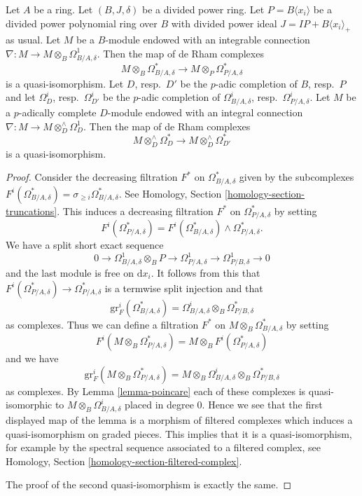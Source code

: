 \begin{lemma}
\label{lemma-relative-poincare}
Let $A$ be a ring. Let $(B, J, \delta)$ be a divided power ring.
Let $P = B\langle x_i \rangle$ be a divided power polynomial
ring over $B$ with divided power ideal $J = IP + B\langle x_i \rangle_{+}$
as usual. Let $M$ be a $B$-module endowed with an integrable connection
$\nabla : M \to M \otimes_B \Omega^1_{B/A, \delta}$. Then the map of
de Rham complexes
$$
M \otimes_B \Omega^*_{B/A, \delta}
\longrightarrow
M \otimes_P \Omega^*_{P/A, \delta}
$$
is a quasi-isomorphism. Let $D$, resp.\ $D'$ be the $p$-adic completion of
$B$, resp.\ $P$ and let $\Omega^i_D$, resp.\ $\Omega^i_{D'}$ be the $p$-adic
completion of $\Omega^i_{B/A, \delta}$,
resp.\ $\Omega^i_{P/A, \delta}$. Let $M$ be a $p$-adically complete
$D$-module endowed with an integral connection
$\nabla : M \to M \otimes^\wedge_D \Omega^1_D$.
Then the map of de Rham complexes
$$
M \otimes^\wedge_D \Omega^*_D
\longrightarrow
M \otimes^\wedge_D \Omega^*_{D'}
$$
is a quasi-isomorphism.
\end{lemma}

\begin{proof}
Consider the decreasing filtration $F^*$ on $\Omega^*_{B/A, \delta}$
given by the subcomplexes
$F^i(\Omega^*_{B/A, \delta}) = \sigma_{\geq i}\Omega^*_{B/A, \delta}$.
See Homology, Section \ref{homology-section-truncations}.
This induces a decreasing filtration $F^*$ on $\Omega^*_{P/A, \delta}$
by setting
$$
F^i(\Omega^*_{P/A, \delta}) =
F^i(\Omega^*_{B/A, \delta}) \wedge \Omega^*_{P/A, \delta}.
$$
We have a split short exact sequence
$$
0 \to \Omega^1_{B/A, \delta} \otimes_B P \to
\Omega^1_{P/A, \delta} \to
\Omega^1_{P/B, \delta} \to 0
$$
and the last module is free on $\text{d}x_i$. It follows from this that
$F^i(\Omega^*_{P/A, \delta}) \to \Omega^*_{P/A, \delta}$ is a termwise
split injection and that
$$
\text{gr}^i_F(\Omega^*_{B/A, \delta}) =
\Omega^i_{B/A, \delta} \otimes_B \Omega^*_{P/B, \delta}
$$
as complexes. Thus we can define a filtration $F^*$ on
$M \otimes_B \Omega^*_{B/A, \delta}$ by setting
$$
F^i(M \otimes_B \Omega^*_{P/A, \delta}) =
M \otimes_B F^i(\Omega^*_{P/A, \delta})
$$
and we have
$$
\text{gr}^i_F(M \otimes_B \Omega^*_{P/A, \delta}) =
M \otimes_B \Omega^i_{B/A, \delta} \otimes_B \Omega^*_{P/B, \delta}
$$
as complexes.
By Lemma \ref{lemma-poincare} each of these complexes is
quasi-isomorphic to $M \otimes_B \Omega^i_{B/A, \delta}$ placed in degree $0$.
Hence we see that the first displayed map of the lemma is a morphism of
filtered complexes which induces a quasi-isomorphism on graded pieces. This
implies that it is a quasi-isomorphism, for example by the spectral sequence
associated to a filtered complex, see
Homology, Section \ref{homology-section-filtered-complex}.

\medskip\noindent
The proof of the second quasi-isomorphism is exactly the same.
\end{proof}




